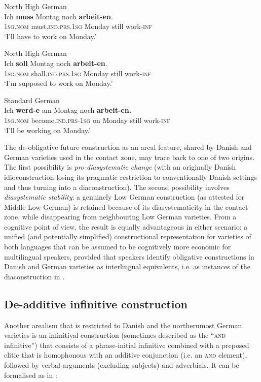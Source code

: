 \documentclass[output=paper]{langsci/langscibook}
\begin{document}
 	\ex\label{ex:hoeder:5b}
	North High German\\
	\gll Ich \textbf{muss} Montag noch \textbf{arbeit-en}.\\
     \textsc{1sg.nom} must.\textsc{ind.prs.1sg} Monday still work-\textsc{inf}\\
	\glt `I’ll have to work on Monday.'

 	\ex\label{ex:hoeder:5c}
	North High German\\
	\gll Ich \textbf{soll} Montag noch \textbf{arbeit-en}.\\
     1\textsc{sg.nom} shall.\textsc{ind.prs.1sg} Monday still work-\textsc{inf}\\
	\glt `I’m supposed to work on Monday.'

	\ex\label{ex:hoeder:5d}
	 Standard German\\
	\gll Ich \textbf{werd-e} am{} Montag noch \textbf{arbeit-en.}\\
     1\textsc{sg.nom} become.\textsc{ind.prs}{}-1\textsc{sg} on Monday still work-\textsc{inf}\\
	\glt `I’ll be working on Monday.'
	\z
\z

The de-obligative future construction as an areal feature, shared by Danish and German varieties used in the contact zone, may trace back to one of two origins. The first possibility is \textit{pro-diasystematic change} (with an originally Danish idioconstruction losing its pragmatic restriction to conventionally Danish settings and thus turning into a diaconstruction). The second possibility involves \textit{diasystematic stability}: a genuinely Low German construction (as attested for Middle Low German) is retained because of its diasystematicity in the contact zone, while disappearing from neighbouring Low German varieties. From a cognitive point of view, the result is equally advantageous in either scenario: a unified (and potentially simplified) constructional representation for varieties of both languages that can be assumed to be cognitively more economic for multilingual speakers, provided that speakers identify obligative constructions in Danish and German varieties as interlingual equivalents, i.e. as instances of the diaconstruction in .


 
\subsection{De-additive infinitive construction}\label{sec:hoeder:4.3}
Another arealism that is restricted to Danish and the northernmost German varieties is an infinitival construction (sometimes described as the “\textsc{and} infinitive”) that consists of a phrase-initial infinitive combined with a preposed clitic that is homophonous with an additive conjunction (i.e. an \textsc{and} element), followed by verbal arguments (excluding subjects) and adverbials. It can be formalised as in :
\end{document}
